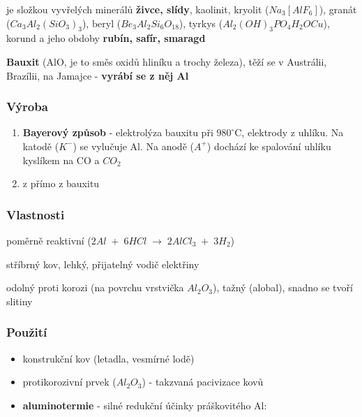 je složkou vyvřelých minerálů \textbf{živce, slídy}, kaolinit, kryolit ($Na_3\left[AlF_6\right]$), granát ($Ca_3Al_2\left(SiO_3\right)_3$),
beryl ($Be_3Al_2Si_6O_{18}$), tyrkys ($Al_2\left(OH\right)_3PO_4H_2OCu$), korund a jeho obdoby \textbf{rubín, safír, smaragd}
\smallskip

\textbf{Bauxit} (AlO, je to směs oxidů hliníku a trochy železa), těží se v Austrálii, Brazílii, na Jamajce - \textbf{vyrábí se z něj Al}

\subsubsection*{Výroba}
\begin{enumerate}
    \item \textbf{Bayerový způsob}
        - elektrolýza bauxitu při $980^\circ$C, elektrody z uhlíku.
        Na katodě ($K^-$) se vylučuje Al.
        Na anodě ($A^+$) dochází ke spalování uhlíku kyslíkem na CO a $CO_2$
    \item  z přímo z bauxitu
\end{enumerate}

\subsubsection*{Vlastnosti}
poměrně reaktivní ($2Al \; + \; 6HCl \; \longrightarrow \; 2AlCl_3 \; + \; 3H_2$)

stříbrný kov, lehký, přijatelný vodič elektřiny

odolný proti korozi (na povrchu vrstvička $Al_2O_3$), tažný (alobal), snadno se tvoří slitiny

\subsubsection{Použití}
\begin{itemize}
    \item konstrukční kov (letadla, vesmírné lodě)
    \item protikorozivní prvek ($Al_2O_3$) - takzvaná pacivizace kovů
    \item \textbf{aluminotermie} - silné redukční účinky práškovitého Al:
\end{itemize}

\begin{multicols}{2}

    


\end{multicols}

